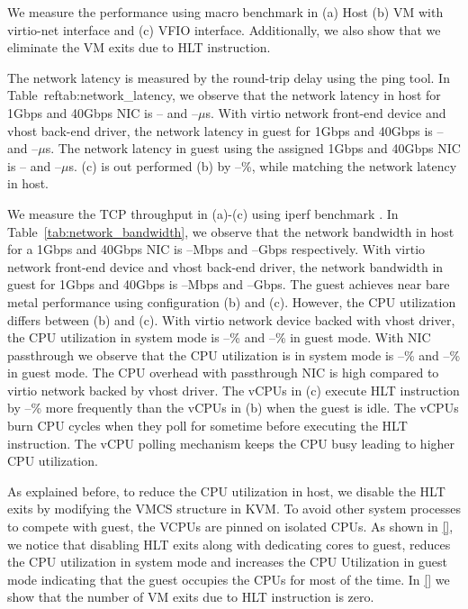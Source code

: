 We measure the performance using macro benchmark in (a) Host
(b) VM with virtio-net interface and (c) VFIO interface.
Additionally, we also show that we eliminate the VM exits due
to HLT instruction.

The network latency is measured by the round-trip delay using
the ping tool. In Table~ref{tab:network\_latency}, we observe
that the network latency in host for 1Gbps and 40Gbps NIC is
-- and --$\mu$s. With virtio network front-end device and
vhost back-end driver, the network latency in guest for 1Gbps
and 40Gbps is -- and --$\mu$s. The network latency in guest
using the assigned 1Gbps and 40Gbps NIC is -- and --$\mu$s.
(c) is out performed (b) by --\%, while matching the network
latency in host.

We measure the TCP throughput in (a)-(c) using iperf benchmark
\cite{}. In Table~\ref{tab:network_bandwidth}, we observe that
the network bandwidth in host for a 1Gbps and 40Gbps NIC is
--Mbps and --Gbps respectively. With virtio network front-end
device and vhost back-end driver, the network bandwidth in
guest for 1Gbps and 40Gbps is --Mbps and --Gbps. The guest
achieves near bare metal performance using configuration (b)
and (c).  However, the CPU utilization differs between (b) and
(c). With virtio network device backed with vhost driver, the
CPU utilization in system mode is --\% and --\% in guest mode.
With NIC passthrough we observe that the CPU utilization is in
system mode is --\% and --\% in guest mode. The CPU overhead
with passthrough NIC is high compared to virtio network backed
by vhost driver. The vCPUs in (c) execute HLT instruction by
--\% more frequently than the vCPUs in (b) when the guest is
idle. The vCPUs burn CPU cycles when they poll for sometime
before executing the HLT instruction. The vCPU polling
mechanism keeps the CPU busy leading to higher CPU
utilization.

As explained before, to reduce the CPU utilization in host, we
disable the HLT exits by modifying the VMCS structure in KVM.
To avoid other system processes to compete with guest, the
VCPUs are pinned on isolated CPUs. As shown in \ref{}, we
notice that disabling HLT exits along with dedicating cores to
guest, reduces the CPU utilization in system mode and
increases the CPU Utilization in guest mode indicating that
the guest occupies the CPUs for most of the time. In \ref{} we
show that the number of VM exits due to HLT instruction is
zero.
